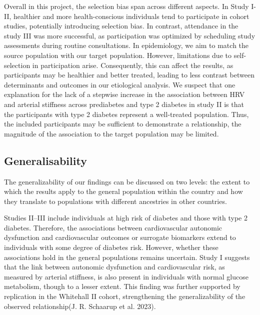 \documentclass[
  a4paper,
  headsepline=true,
  open=any]{scrbook}
\begin{document}
Overall in this project, the selection bias span across different
aspects. In Study I-II, healthier and more health-conscious individuals
tend to participate in cohort studies, potentially introducing selection
bias. In contrast, attendance in the study III was more successful, as
participation was optimized by scheduling study assessments during
routine consultations. In epidemiology, we aim to match the source
population with our target population. However, limitations due to
self-selection in participation arise. Consequently, this can affect the
results, as participants may be healthier and better treated, leading to
less contrast between determinants and outcomes in our etiological
analysis. We suspect that one explanation for the lack of a stepwise
increase in the association between HRV and arterial stiffness across
prediabetes and type 2 diabetes in study II is that the participants
with type 2 diabetes represent a well-treated population. Thus, the
included participants may be sufficient to demonstrate a relationship,
the magnitude of the association to the target population may be
limited.

\hypertarget{generalisability}{%
\subsection{Generalisability}\label{generalisability}}

The generalizability of our findings can be discussed on two levels: the
extent to which the results apply to the general population within the
country and how they translate to populations with different ancestries
in other countries.

Studies II--III include individuals at high risk of diabetes and those
with type 2 diabetes. Therefore, the associations between cardiovascular
autonomic dysfunction and cardiovascular outcomes or surrogate
biomarkers extend to individuals with some degree of diabetes risk.
However, whether these associations hold in the general populations
remains uncertain. Study I suggests that the link between autonomic
dysfunction and cardiovascular risk, as measured by arterial stiffness,
is also present in individuals with normal glucose metabolism, though to
a lesser extent. This finding was further supported by replication in
the Whitehall II cohort, strengthening the generalizability of the
observed relationship(J. R. Schaarup et al. 2023).
\end{document}
